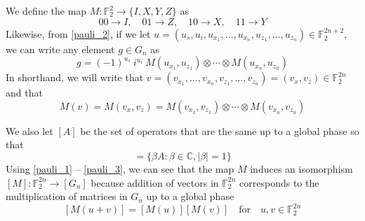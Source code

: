 \documentclass[11pt]{article}
\theoremstyle{definition}
\theoremstyle{plain}
\begin{document}
We define the map $M: \mathbb{F}_2^2 \rightarrow \{I, X, Y, Z\}$ as
\begin{equation}
  00 \rightarrow I, \quad 01 \rightarrow Z, \quad 10 \rightarrow X, \quad
  11 \rightarrow Y 
\end{equation}
Likewise, from {\ref{pauli_2}}, if we let $u = (u_s, u_i, u_{x_1}, \ldots, u_{x_n}, u_{z_1}, \ldots, u_{z_n}) \in \mathbb{F}_2^{2n+2}$, we can write any element $g \in G_n$ as
\begin{equation}
  g = {(-1)}^{u_s} \ i^{u_i} \ M(u_{x_1}, u_{z_1}) \otimes \cdots \otimes
  M(u_{x_n}, u_{z_n}) 
\end{equation}
In shorthand, we will write that $v = (v_{x_1}, \ldots, v_{x_n}, v_{z_1}, \ldots, v_{z_n}) = (v_x, v_z) \in \mathbb{F}_2^{2n}$ and that
\begin{equation}\label{shorthand_1}
  M(v) = M(v_x, v_z) = M(v_{x_1}, v_{z_1}) \otimes \cdots \otimes
  M(v_{x_n}, v_{z_n}) 
\end{equation}

We also let $[A]$ be the set of operators that are the same up to a global phase so that
\begin{equation}
  [A] = \{\beta A : \beta \in \mathbb{C} , |\beta| = 1 \}
\end{equation}
Using {\ref{pauli_1}} {--} {\ref{pauli_3}}, we can see that the map $M$ induces an isomorphism $[M]: \mathbb{F}_2^{2n} \rightarrow [G_n]$ because addition of vectors in $\mathbb{F}_2^{2n}$ corresponds to the multiplication of matrices in $G_n$ up to a global phase
\begin{equation}\label{isomorphism} 
  [M(u + v)] = [M(u)][M(v)] \quad \text{for} \quad u, v \in \mathbb{F}_2^{2n}
\end{equation}
\end{document}
